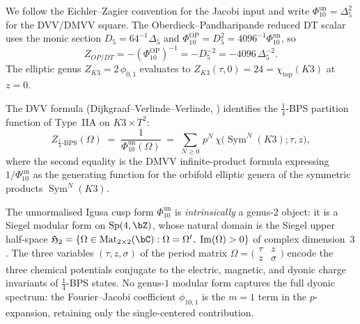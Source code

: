 \begin{remark}[Conventions]\label{rem:bkm-conventions}
We follow the Eichler--Zagier convention for the Jacobi input and write
\(\Phi_{10}^{\mathrm{un}}=\Delta_5^2\) for the DVV/DMVV square. The
Oberdieck--Pandharipande reduced DT scalar uses the monic section
\(D_5=64^{-1}\Delta_5\) and
\(\Phi_{10}^{\mathrm{OP}}=D_5^2=4096^{-1}\Phi_{10}^{\mathrm{un}}\), so
\[
Z_{OP/DT}=-(\Phi_{10}^{\mathrm{OP}})^{-1}
=-D_5^{-2}=-4096\,\Delta_5^{-2}.
\]
The elliptic genus \(Z_{K3} = 2\,\phi_{0,1}\) evaluates to
\(Z_{K3}(\tau,0) = 24 = \chi_{\mathrm{top}}(K3)\) at \(z = 0\).
\end{remark}

The DVV formula (Dijkgraaf--Verlinde--Verlinde,
\cite{DMVV}) identifies the $\frac{1}{4}$-BPS
partition function of Type~IIA on $K3 \times T^2$:
\begin{equation}\label{eq:dvv}
Z_{\frac{1}{4}\text{-BPS}}(\Omega) \;=\; \frac{1}{\Phi_{10}^{\mathrm{un}}(\Omega)}
\;=\; \sum_{N \geq 0}\,p^N\,\chi\bigl(\operatorname{Sym}^N(K3);
\tau,z\bigr),
\end{equation}
where the second equality is the DMVV infinite-product formula
expressing \(1/\Phi_{10}^{\mathrm{un}}\) as the generating function for the
orbifold elliptic genera of the symmetric products
$\operatorname{Sym}^N(K3)$.

\begin{proposition}
\label{prop:phi10-genus2}
The unnormalised Igusa cusp form \(\Phi_{10}^{\mathrm{un}}\) is \emph{intrinsically}
a genus-$2$ object: it is a Siegel modular form on
$\operatorname{Sp}(4,\bZ)$, whose natural domain is the
Siegel upper half-space
$\mathfrak{H}_2 = \{\Omega \in \mathrm{Mat}_{2 \times 2}(\bC)
: \Omega = \Omega^t,\; \operatorname{Im}(\Omega) > 0\}$
of complex dimension~$3$. The three
variables $(\tau,z,\sigma)$ of the period matrix
$\Omega = \bigl(\begin{smallmatrix} \tau & z \\
z & \sigma\end{smallmatrix}\bigr)$ encode the three
chemical potentials conjugate to the electric, magnetic,
and dyonic charge invariants of $\frac{1}{4}$-BPS states.
No genus-$1$ modular form captures the full dyonic
spectrum: the Fourier--Jacobi coefficient $\phi_{10,1}$
is the $m = 1$ term in the $p$-expansion, retaining only
the single-centered contribution.
\end{proposition}

